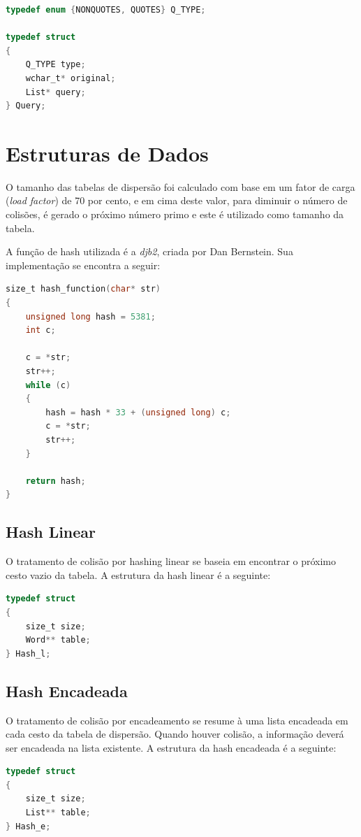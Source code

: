 \documentclass[a4paper,12pt]{article}
\begin{document}
\begin{lstlisting}[language=C, caption=Estrutura Query e QTYPE]
typedef enum {NONQUOTES, QUOTES} Q_TYPE;

typedef struct 
{
	Q_TYPE type;
	wchar_t* original;
	List* query;
} Query;
\end{lstlisting}


\section{Estruturas de Dados}
O tamanho das tabelas de dispersão foi calculado com base em um fator de carga (\emph{load factor}) de 70 por cento, e em 
cima deste valor, para diminuir o número de colisões, é gerado o próximo número primo e este é utilizado como tamanho da tabela.

A função de hash utilizada é a \emph{djb2}, criada por Dan Bernstein.
Sua implementação se encontra a seguir:

\begin{lstlisting}[language=C, caption=Função de hash DJB2]
size_t hash_function(char* str)
{
	unsigned long hash = 5381;
	int c;

	c = *str;
	str++;
	while (c)
	{
		hash = hash * 33 + (unsigned long) c;  
		c = *str;
		str++;
	}

	return hash;
}
\end{lstlisting}

\newpage

\subsection{Hash Linear}
O tratamento de colisão por hashing linear se baseia em encontrar o próximo cesto vazio da tabela. 
A estrutura da hash linear é a seguinte:

\begin{lstlisting}[language=C, caption=Estrutura da Hash Linear]
typedef struct
{
	size_t size;
	Word** table;
} Hash_l;
\end{lstlisting}


\subsection{Hash Encadeada}
O tratamento de colisão por encadeamento se resume à uma lista encadeada em cada cesto da tabela de dispersão.
Quando houver colisão, a informação deverá ser encadeada na lista existente. 
A estrutura da hash encadeada é a seguinte:

\begin{lstlisting}[language=C, caption=Estrutura da Hash Encadeada]
typedef struct
{
	size_t size;
	List** table;
} Hash_e;
\end{lstlisting}
\end{document}
